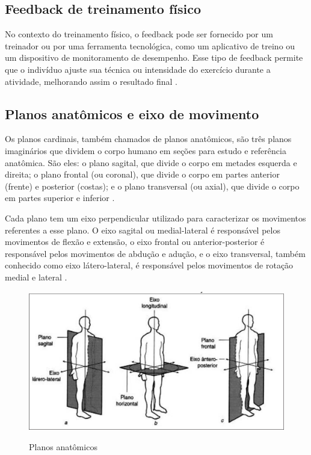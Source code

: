 \subsection[Feedback de treinamento físico]{Feedback de treinamento físico}


No contexto do treinamento físico, o feedback pode ser fornecido por um treinador ou por uma ferramenta tecnológica, como um aplicativo de treino ou um dispositivo de monitoramento de desempenho. Esse tipo de feedback permite que o indivíduo ajuste sua técnica ou intensidade do exercício durante a atividade, melhorando assim o resultado final \cite{feedback}.




\subsection[Planos anatômicos e eixo de movimento]{Planos anatômicos e eixo de movimento}

Os planos cardinais, também chamados de planos anatômicos, são três planos imaginários que dividem o corpo humano em seções para estudo e referência anatômica. São eles: o plano sagital, que divide o corpo em metades esquerda e direita; o plano frontal (ou coronal), que divide o corpo em partes anterior (frente) e posterior (costas); e o plano transversal (ou axial), que divide o corpo em partes superior e inferior \cite{cinesiologia}.

Cada plano tem um eixo perpendicular utilizado para caracterizar os movimentos referentes a esse plano. O eixo sagital ou medial-lateral é responsável pelos movimentos de flexão e extensão, o eixo frontal ou anterior-posterior é responsável pelos movimentos de abdução e adução, e o eixo transversal, também conhecido como eixo látero-lateral, é responsável pelos movimentos de rotação medial e lateral \cite{cinesiologia}.


\begin{figure}[H]
	\centering
    \caption{Planos anatômicos}
	\includegraphics[scale=0.15]{figuras/TAF/planos.png}
	\label{fig:Planos anatomicos}
\end{figure}


